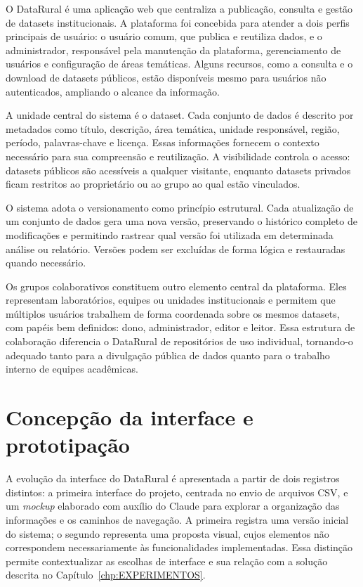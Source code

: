O DataRural é uma aplicação web que centraliza a publicação, consulta e gestão de datasets institucionais. A plataforma foi concebida para atender a dois perfis principais de usuário: o usuário comum, que publica e reutiliza dados, e o administrador, responsável pela manutenção da plataforma, gerenciamento de usuários e configuração de áreas temáticas. Alguns recursos, como a consulta e o download de datasets públicos, estão disponíveis mesmo para usuários não autenticados, ampliando o alcance da informação.

A unidade central do sistema é o dataset. Cada conjunto de dados é descrito por metadados como título, descrição, área temática, unidade responsável, região, período, palavras-chave e licença. Essas informações fornecem o contexto necessário para sua compreensão e reutilização. A visibilidade controla o acesso: datasets públicos são acessíveis a qualquer visitante, enquanto datasets privados ficam restritos ao proprietário ou ao grupo ao qual estão vinculados.

O sistema adota o versionamento como princípio estrutural. Cada atualização de um conjunto de dados gera uma nova versão, preservando o histórico completo de modificações e permitindo rastrear qual versão foi utilizada em determinada análise ou relatório. Versões podem ser excluídas de forma lógica e restauradas quando necessário.

Os grupos colaborativos constituem outro elemento central da plataforma. Eles representam laboratórios, equipes ou unidades institucionais e permitem que múltiplos usuários trabalhem de forma coordenada sobre os mesmos datasets, com papéis bem definidos: dono, administrador, editor e leitor. Essa estrutura de colaboração diferencia o DataRural de repositórios de uso individual, tornando-o adequado tanto para a divulgação pública de dados quanto para o trabalho interno de equipes acadêmicas.

\section{Concepção da interface e prototipação}\label{sec:prototipacao}

A evolução da interface do DataRural é apresentada a partir de dois registros distintos: a primeira interface do projeto, centrada no envio de arquivos CSV, e um \textit{mockup} elaborado com auxílio do Claude para explorar a organização das informações e os caminhos de navegação. A primeira registra uma versão inicial do sistema; o segundo representa uma proposta visual, cujos elementos não correspondem necessariamente às funcionalidades implementadas. Essa distinção permite contextualizar as escolhas de interface e sua relação com a solução descrita no Capítulo~\ref{chp:EXPERIMENTOS}.

